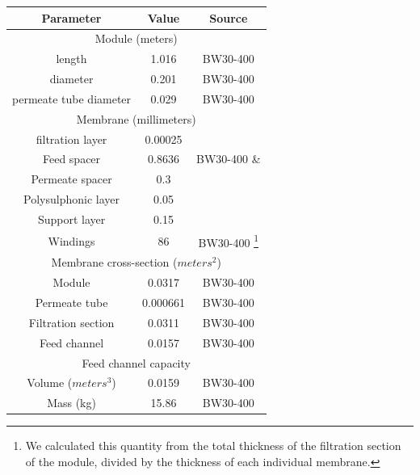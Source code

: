 \begin{savenotes}
\begin{table}[!h]
    \centering
    \begin{tabular}{|c|c|c|}
        \toprule
        \textbf{Parameter} & \textbf{Value} & \textbf{Source} \\ \midrule
        
        \multicolumn{3}{c}{Module (meters)} \\ \midrule
        length & 1.016 & BW30-400 \cite{2020FilmTecElement} \\ 
        diameter & 0.201 & BW30-400 \cite{2020FilmTecElement}\\
        permeate tube diameter & 0.029 & BW30-400 \cite{2020FilmTecElement}\\ \midrule
        
        \multicolumn{3}{c}{Membrane (millimeters)} \\ \midrule
        filtration layer & 0.00025 & \cite{Pacheco2010CharacterizationTechniques,Jeong2007InterfacialMembranes} \\
        Feed spacer & 0.8636 & BW30-400 \cite{2020FilmTecElement} \& \cite{Sablani2002InfluenceSystems} \\
        Permeate spacer & 0.3 & \cite{} \\
        Polysulphonic layer & 0.05 & \cite{} \\
        Support layer & 0.15 & \cite{} \\
        Windings & 86 & BW30-400 
        \footnote{We calculated this quantity from the total thickness of the filtration section of the module, divided by the thickness of each individual membrane.}\\ \midrule
        
        \multicolumn{3}{c}{Membrane cross-section ($meters^2$)} \\ \midrule
        Module & 0.0317 & BW30-400 \cite{2020FilmTecElement}\\
        Permeate tube & 0.000661 & BW30-400 \cite{2020FilmTecElement}\\
        Filtration section & 0.0311 & BW30-400 \cite{2020FilmTecElement}\\
        Feed channel & 0.0157 & BW30-400 \cite{2020FilmTecElement}\\ \midrule
        
        \multicolumn{3}{c}{Feed channel capacity} \\ \midrule
        Volume ($meters^3$) & 0.0159 & BW30-400 \cite{2020FilmTecElement}\\
        Mass (kg) & 15.86 & BW30-400 \cite{2020FilmTecElement}\\ \midrule


\end{tabular}
\end{table}
\end{savenotes}
